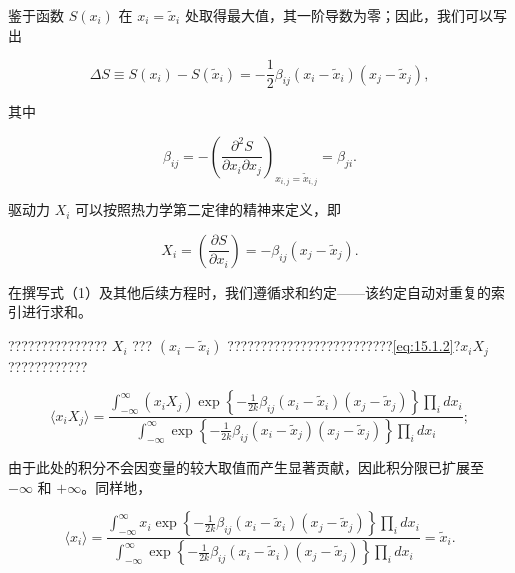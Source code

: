 鉴于函数 \(S(x_i)\) 在 \(x_i = \tilde{x}_i\) 处取得最大值，其一阶导数为零；因此，我们可以写出

\begin{equation}\tag{15.6.29}\label{eq:15.6.29}
\Delta S \equiv S ( x _ { i } ) - S ( \tilde { x } _ { i } ) = - \frac { 1 } { 2 } \beta _ { i j } ( x _ { i } - \tilde { x } _ { i } ) ( x _ { j } - \tilde { x } _ { j } ) ,
\end{equation}

其中

\begin{equation}\tag{15.6.30}\label{eq:15.6.30}
\beta _ { i j } = - \left( \frac { \partial ^{2} S } { \partial x _ { i } \partial x _ { j } } \right) _ { x _ { i , j } = \tilde { x } _ { i , j } } = \beta _ { j i } .
\end{equation}

驱动力 \(X_{i}\) 可以按照热力学第二定律的精神来定义，即

\begin{equation}\tag{15.6.31}\label{eq:15.6.31}
X _ { i } = \left( \frac { \partial S } { \partial x _ { i } } \right) = - \beta _ { i j } ( x _ { j } - \tilde { x } _ { j } ) .
\end{equation}

在撰写式（1）及其他后续方程时，我们遵循求和约定------该约定自动对重复的索引进行求和。

??????????????? \(X_i\) ??? \((x_i - \tilde{x}_i)\) ?????????????????????????\autoref{eq:15.1.2}?\(x_iX_j\) ????????????

\begin{equation}\tag{15.6.32}\label{eq:15.6.32}
\langle x _ { i } X _ { j } \rangle = \frac { \int _ { - \infty } ^{\infty} ( x _ { i } X _ { j } ) \exp \left\{ - \frac { 1 } { 2 k } \beta _ { i j } ( x _ { i } - \tilde { x } _ { i } ) ( x _ { j } - \tilde { x } _ { j } ) \right\} \prod _ { i } d x _ { i } } { \int _ { - \infty } ^{\infty} \exp \left\{ - \frac { 1 } { 2 k } \beta _ { i j } ( x _ { i } - \tilde { x } _ { j } ) ( x _ { j } - \tilde { x } _ { j } ) \right\} \prod _ { i } d x _ { i } } ;
\end{equation}

由于此处的积分不会因变量的较大取值而产生显著贡献，因此积分限已扩展至 \(-\infty\) 和 \(+\infty\)。同样地，

\begin{equation}\tag{15.6.33}\label{eq:15.6.33}
\langle x _ { i } \rangle = \frac { \int _ { - \infty } ^{\infty} x _ { i } \exp \left\{ - \frac { 1 } { 2 k } \beta _ { i j } ( x _ { i } - \tilde { x } _ { i } ) ( x _ { j } - \tilde { x } _ { j } ) \right\} \prod _ { i } d x _ { i } } { \int _ { - \infty } ^{\infty} \exp \left\{ - \frac { 1 } { 2 k } \beta _ { i j } ( x _ { i } - \tilde { x } _ { i } ) ( x _ { j } - \tilde { x } _ { j } ) \right\} \prod _ { i } d x _ { i } } = \tilde { x } _ { i } .
\end{equation}

